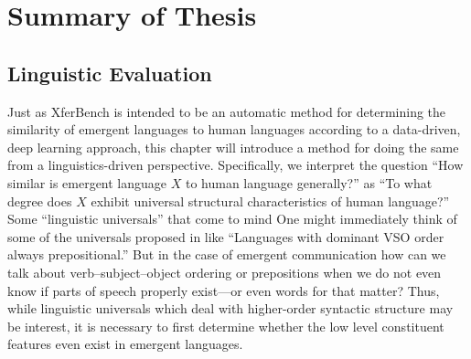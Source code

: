 \section{Summary of Thesis}


\subsection{Linguistic Evaluation}

Just as XferBench is intended to be an automatic method for determining the similarity of emergent languages to human languages according to a data-driven, deep learning approach, this chapter will introduce a method for doing the same from a linguistics-driven perspective.
Specifically, we interpret the question ``How similar is emergent language $X$ to human language generally?'' as ``To what degree does $X$ exhibit universal structural characteristics of human language?''
Some ``linguistic universals'' that come to mind 
One might immediately think of some of the universals proposed in \citet{greenberg1963universals} like ``Languages with dominant VSO order always prepositional.''
But in the case of emergent communication how can we talk about verb--subject--object ordering or prepositions when we do not even know if parts of speech properly exist---or even words for that matter?
Thus, while linguistic universals which deal with higher-order syntactic structure may be interest, it is necessary to first determine whether the low level constituent features even exist in emergent languages.



